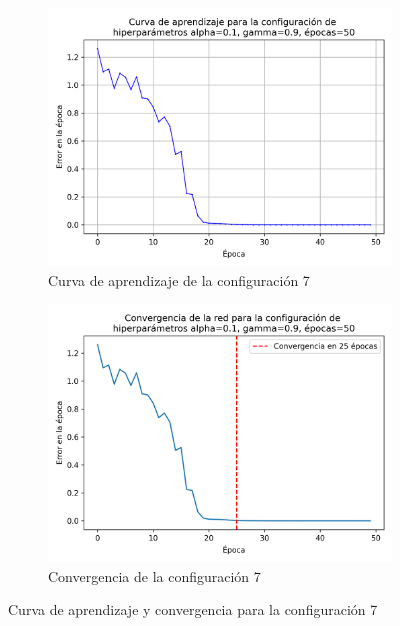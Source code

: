 \documentclass{article}
\begin{document}
\begin{figure}[h!]
    \centering
    \begin{subfigure}{0.49\textwidth}
        \includegraphics[width=\linewidth]{imgs/XOR/configs/curva_aprendizaje_alpha_0.1_gamma_0.9_epochs_50.png}
        \caption{Curva de aprendizaje de la configuración 7}
        \label{fig:conf_7_xor_lr}
    \end{subfigure}
    \hfill
    \begin{subfigure}{0.49\textwidth}
        \includegraphics[width=\linewidth]{imgs/XOR/configs/convergencia_alpha_0.1_gamma_0.9_epochs_50.png}
        \caption{Convergencia de la configuración 7}
        \label{fig:conf7_xor_con}
    \end{subfigure}
    \caption{Curva de aprendizaje y convergencia para la configuración 7}
    \label{fig:conf7_lr_con_xor}
\end{figure}
\end{document}
